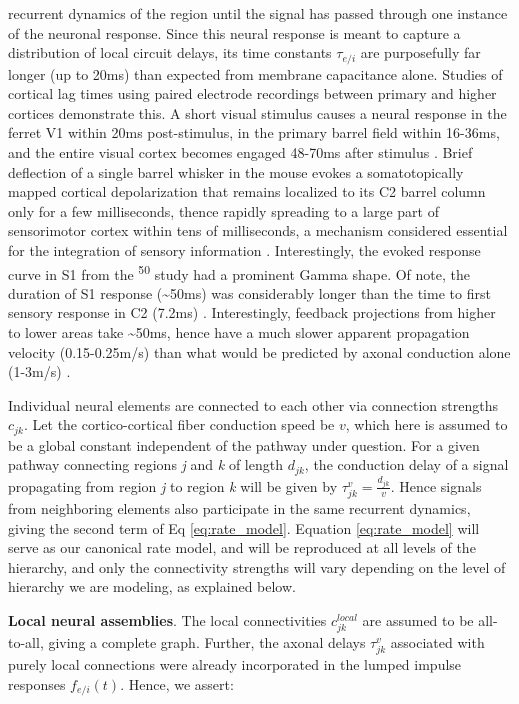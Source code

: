 recurrent dynamics of the region until the signal has passed through one
instance of the neuronal response. Since this neural response is meant
to capture a distribution of local circuit delays, its time constants
$\tau_{e/i}$ are purposefully far longer (up to 20ms) than expected
from membrane capacitance alone. Studies of cortical lag times using
paired electrode recordings between primary and higher cortices
demonstrate this. A short visual stimulus causes a neural response in
the ferret V1 within 20ms post-stimulus, in the primary barrel field
within 16-36ms, and the entire visual cortex becomes engaged 48-70ms
after stimulus \cite{roland_tracing_2014}. Brief deflection of a single barrel
whisker in the mouse evokes a somatotopically mapped cortical
depolarization that remains localized to its C2 barrel column only for a
few milliseconds, thence rapidly spreading to a large part of
sensorimotor cortex within tens of milliseconds, a mechanism considered
essential for the integration of sensory information
\cite{ferezou_spatiotemporal_2007, polack_long-range_2012}. Interestingly, the evoked response curve in S1
from the \textsuperscript{50} study had a prominent Gamma shape. Of
note, the duration of S1 response (\textasciitilde50ms) was considerably
longer than the time to first sensory response in C2 (7.2ms)
\cite{ferezou_spatiotemporal_2007}. Interestingly, feedback projections from higher to
lower areas take \textasciitilde50ms, hence have a much slower apparent
propagation velocity (0.15-0.25m/s) than what would be predicted by
axonal conduction alone (1-3m/s) \cite{roland_tracing_2014}.

Individual neural elements are connected to each other via connection
strengths $c_{jk}$. Let the cortico-cortical fiber conduction
speed be $v$, which here is assumed to be a global constant
independent of the pathway under question. For a given pathway
connecting regions \emph{j} and \emph{k} of length $d_{jk}$,
the conduction delay of a signal propagating from region \emph{j} to region
\emph{k} will be given by
$\tau^{v}_{jk} = \frac{d_{jk}}{v}$. Hence signals from
neighboring elements also participate in the same recurrent dynamics,
giving the second term of Eq \ref{eq:rate_model}. Equation \ref{eq:rate_model} will serve
as our canonical rate model, and will be reproduced at all levels of the
hierarchy, and only the connectivity strengths will vary depending on
the level of hierarchy we are modeling, as explained below.

\textbf{Local neural assemblies}. The local connectivities
$c_{jk}^{local}$ are assumed to be all-to-all, giving a
complete graph. Further, the axonal delays $\tau_{jk}^{v}$
associated with purely local connections were already incorporated in
the lumped impulse responses $f_{e/i}(t)$. Hence, we assert:

